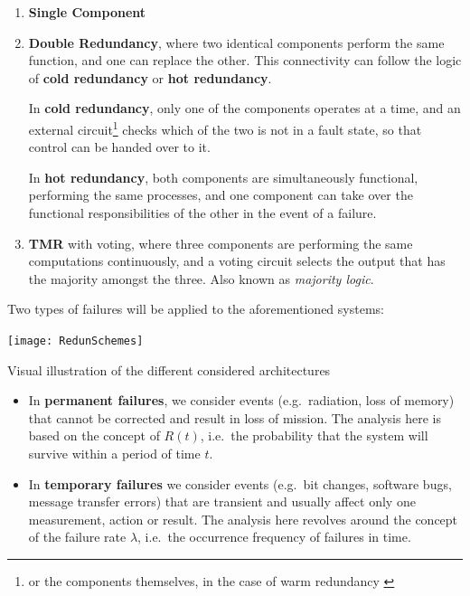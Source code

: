 \documentclass[a4paper,nobib,final]{tufte-book}
\def\e{\ignorespaces}
\def\acusepage#1{}
\begin{document}
\begin{enumerate}
	\item \textbf{Single Component}
	\item \textbf{Double Redundancy}, where two identical components perform the same function, and one can replace the other. This connectivity can follow the logic of \textbf{cold redundancy} or \textbf{hot redundancy}.
	
	In \textbf{cold redundancy}, only one of the components operates at a time, and an external circuit\footnote{or the components themselves, in the case of warm redundancy \autocite[20]{SAVOIR-HB-003}} checks which of the two is not in a fault state, so that control can be handed over to it.

	In \textbf{hot redundancy}, both components are simultaneously functional, performing the same processes, and one component can take over the functional responsibilities of the other in the event of a failure.

	\item \textbf{\acf{TMR}} with voting, where three components are performing the same computations continuously, and a voting circuit selects the output that has the majority amongst the three. Also known as \emph{majority logic}.
\end{enumerate}

Two types of failures will be applied to the aforementioned systems:

\begin{marginfigure}
\centering
\texttt{[image: RedunSchemes]}
\caption{Visual illustration of the different considered architectures}
\acusepage{voter}
\end{marginfigure}
\begin{itemize}
\item In \textbf{permanent failures}, we consider events (e.g.\ radiation, loss of memory) that cannot be corrected and result in loss of mission. The analysis here is based on the concept of \e{reliability} \( R(t) \), i.e.\ the probability that the system will survive within a period of time \( t \).
\item In \textbf{temporary failures} we consider events (e.g.\ bit changes, software bugs, message transfer errors) that are transient and usually affect only one measurement, action or result. The analysis here revolves around the concept of the failure rate \( \lambda \), i.e.\ the occurrence frequency of failures in time.
\end{itemize}
\end{document}
